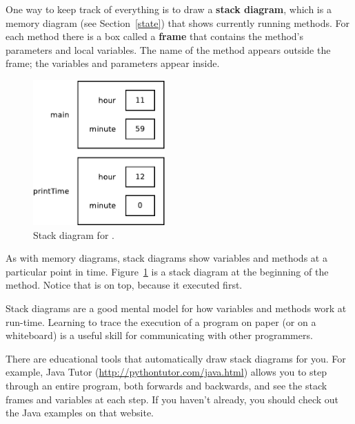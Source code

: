 One way to keep track of everything is to draw a {\bf stack diagram}, which is a memory diagram (see Section~\ref{state}) that shows currently running methods.
For each method there is a box called a {\bf frame} that contains the method's parameters and local variables.
The name of the method appears outside the frame; the variables and parameters appear inside.

\begin{figure}[!ht]
\begin{center}
\includegraphics[height=15em]{figs/stack1.pdf}
\caption{Stack diagram for .}
\label{fig.stack}
\end{center}
\end{figure}

As with memory diagrams, stack diagrams show variables and methods at a particular point in time.
Figure~\ref{fig.stack} is a stack diagram at the beginning of the  method.
Notice that  is on top, because it executed first.




Stack diagrams are a good mental model for how variables and methods work at run-time.
Learning to trace the execution of a program on paper (or on a whiteboard) is a useful skill for communicating with other programmers.

There are educational tools that automatically draw stack diagrams for you.
For example, Java Tutor (\url{http://pythontutor.com/java.html}) allows you to step through an entire program, both forwards and backwards, and see the stack frames and variables at each step.
If you haven't already, you should check out the Java examples on that website.



